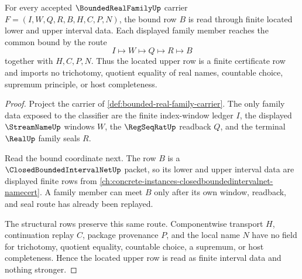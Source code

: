 \begin{theorem}
\label{thm:bounded-real-family-located-upper-row}
For every accepted $\BoundedRealFamilyUp$ carrier $F=(I,W,Q,R,B,H,C,P,N)$, the bound row $B$ is read through finite located lower and upper interval data. Each displayed family member reaches the common bound by the route
$$
I\longmapsto W\longmapsto Q\longmapsto R\longmapsto B
$$
together with $H,C,P,N$. Thus the located upper row is a finite certificate row and imports no trichotomy, quotient equality of real names, countable choice, supremum principle, or host completeness.
\end{theorem}
\begin{proof}
Project the carrier of \autoref{def:bounded-real-family-carrier}. The only family data exposed to the classifier are the finite index-window ledger $I$, the displayed $\StreamNameUp$ windows $W$, the $\RegSeqRatUp$ readback $Q$, and the terminal $\RealUp$ family seals $R$.

Read the bound coordinate next. The row $B$ is a $\ClosedBoundedIntervalNetUp$ packet, so its lower and upper interval data are displayed finite rows from \autoref{ch:concrete-instances-closedboundedintervalnet-namecert}. A family member can meet $B$ only after its own window, readback, and seal route has already been replayed.

The structural rows preserve this same route. Componentwise transport $H$, continuation replay $C$, package provenance $P$, and the local name $N$ have no field for trichotomy, quotient equality, countable choice, a supremum, or host completeness. Hence the located upper row is read as finite interval data and nothing stronger.
\end{proof}

